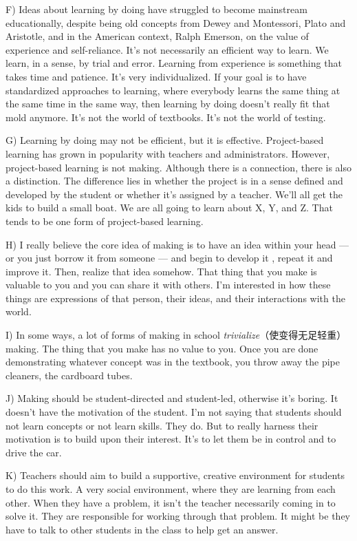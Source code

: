 \documentclass[UTF8,11pt]{ctexart}
\begin{document}
F) Ideas about learning by doing have struggled to become mainstream educationally, despite being old concepts from Dewey and Montessori, Plato and Aristotle, and in the American context, Ralph Emerson, on the value of experience and self-reliance. It’s not necessarily an efficient way to learn. We learn, in a sense, by trial and error. Learning from experience is something that takes time and patience. It’s very individualized. If your goal is to have standardized approaches to learning, where everybody learns the same thing at the same time in the same way, then learning by doing doesn’t really fit that mold anymore. It’s not the world of textbooks. It’s not the world of testing.


G) Learning by doing may not be efficient, but it is effective. Project-based learning has grown in popularity with teachers and administrators. However, project-based learning is not making. Although there is a connection, there is also a distinction. The difference lies in whether the project is in a sense defined and developed by the student or whether it’s assigned by a teacher. We’ll all get the kids to build a small boat. We are all going to learn about X, Y, and Z. That tends to be one form of project-based learning.


H) I really believe the core idea of making is to have an idea within your head — or you just borrow it from someone — and begin to develop it , repeat it and improve it. Then, realize that idea somehow. That thing that you make is valuable to you and you can share it with others. I’m interested in how these things are expressions of that person, their ideas, and their interactions with the world.


I) In some ways, a lot of forms of making in school\textit{ trivialize}（使变得无足轻重）making. The thing that you make has no value to you. Once you are done demonstrating whatever concept was in the textbook, you throw away the pipe cleaners, the cardboard tubes.


J) Making should be student-directed and student-led, otherwise it’s boring. It doesn’t have the motivation of the student. I’m not saying that students should not learn concepts or not learn skills. They do. But to really harness their motivation is to build upon their interest. It’s to let them be in control and to drive the car.


K) Teachers should aim to build a supportive, creative environment for students to do this work. A very social environment, where they are learning from each other. When they have a problem, it isn’t the teacher necessarily coming in to solve it. They are responsible for working through that problem. It might be they have to talk to other students in the class to help get an answer.
\end{document}
